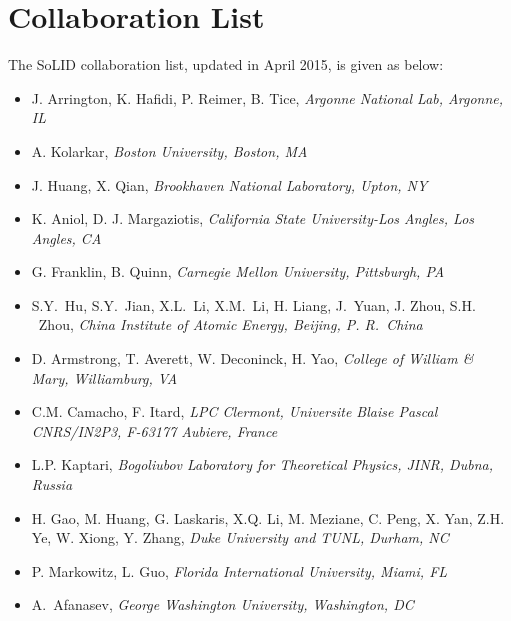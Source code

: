 \appendix
\section{Collaboration List}

 The SoLID collaboration list, updated in April 2015, is given as below:

\begin{itemize}

\item J. Arrington, K. Hafidi, P. Reimer, B. Tice,  
\emph{Argonne National Lab, Argonne, IL}
 
\item A. Kolarkar, \emph{Boston University, Boston, MA}
 
\item J. Huang, X. Qian, \emph{Brookhaven National Laboratory, Upton, NY}
 
\item K. Aniol, D. J. Margaziotis, \emph{California State University-Los Angles, Los Angles, CA}
 
\item G. Franklin, B. Quinn,  \emph{Carnegie Mellon University, Pittsburgh, PA}
 
\item S.Y.~Hu, S.Y.~Jian, X.L.~Li,  X.M.~Li, H. Liang,
J.~Yuan, J. Zhou, S.H. ~Zhou,
\emph{China Institute of Atomic Energy, Beijing, P. R.~China}
 
\item D. Armstrong, T. Averett, W. Deconinck, H. Yao, 
\emph{College of William \& Mary, Williamburg, VA}
 
\item C.M. Camacho, F. Itard,
\emph{LPC Clermont, Universite Blaise Pascal CNRS/IN2P3, F-63177 Aubiere, France}
  
\item L.P. Kaptari,  
\emph{Bogoliubov Laboratory for Theoretical Physics, JINR, Dubna, Russia}
  
\item H. Gao, M. Huang,
 G. Laskaris, X.Q. Li, M. Meziane,
 C. Peng, X. Yan, Z.H. Ye, W. Xiong, Y. Zhang, 
\emph{Duke University and TUNL, Durham, NC}
  
\item P. Markowitz, L. Guo, 
\emph{Florida International University, Miami, FL}
  
\item A.~Afanasev, 
\emph{George Washington University, Washington, DC}
 

\end{itemize}
